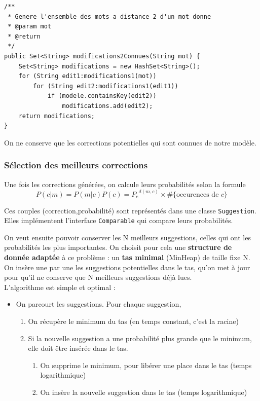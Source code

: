 \documentclass[10pt,a4paper]{article}
\begin{document}
\begin{lstlisting}
/**
 * Genere l'ensemble des mots a distance 2 d'un mot donne 
 * @param mot
 * @return
 */
public Set<String> modifications2Connues(String mot) {
    Set<String> modifications = new HashSet<String>();
    for (String edit1:modifications1(mot))
        for (String edit2:modifications1(edit1))
            if (modele.containsKey(edit2))
                modifications.add(edit2);
    return modifications;
}
\end{lstlisting}

On ne conserve que les corrections potentielles qui sont connues de notre modèle.

\subsubsection{Sélection des meilleurs corrections}

Une fois les corrections générées, on calcule leurs probabilités selon la formule \begin{equation}
P(c|m) = P(m|c)P(c) ={P_e}^{d(m,c)} \times \#\{\text{occurences de }c\}
\end{equation}

Ces couples (correction,probabilité) sont représentés dans une classe \verb!Suggestion!. Elles implémentent l'interface \verb!Comparable! qui compare leurs probabilités.



On veut ensuite pouvoir conserver les N meilleurs suggestions, celles qui ont les probabilités les plus importantes.
On choisit pour cela une \textbf{structure de donnée adaptée} à ce problème : un \textbf{tas minimal} (MinHeap) de taille fixe N.
On insère une par une les suggestions potentielles dans le tas, qu'on met à jour pour qu'il ne conserve que N meilleurs suggestions déjà lues.\\

L'algorithme est simple et optimal : \\
\begin{itemize}
\item On parcourt les suggestions. Pour chaque suggestion, 
\begin{enumerate}
\item On récupère le minimum du tas (en temps constant, c'est la racine)
\item Si la nouvelle suggestion a une probabilité plus grande que le minimum, elle doit être insérée dans le tas.
\begin{enumerate}
\item On supprime le minimum, pour libérer une place dans le tas (temps logarithmique)
\item On insère la nouvelle suggestion dans le tas (temps logarithmique)
\end{enumerate}
\end{enumerate}
\end{itemize}
\end{document}
